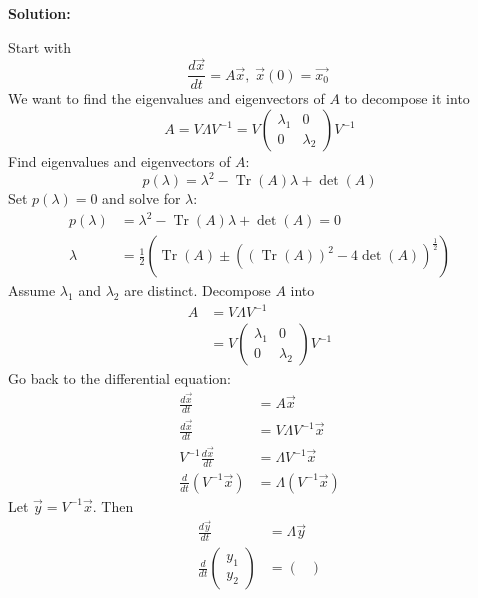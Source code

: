 \documentclass[12pt]{article}
\DeclareMathOperator{\Tr}{Tr}
\newenvironment{solution}{
    \textbf{Solution:}
    
}{
    
    \vspace{2em}
}
\begin{document}
\begin{solution}
    Start with
    \[
        \frac{d\vec{x}}{dt} = A\vec{x}, \; \vec{x}(0) = \vec{x_0} \;
    \]
    We want to find the eigenvalues and eigenvectors of \(A\) to decompose it into
    \[
        A = V\Lambda V^{-1} = V\begin{pmatrix}
            \lambda_1 & 0 \\
            0 & \lambda_2
        \end{pmatrix}V^{-1}
    \]
    Find eigenvalues and eigenvectors of \(A\):
    \[
        p(\lambda) = \lambda^2 - \Tr(A)\lambda + \det(A)
    \]
    Set \(p(\lambda) = 0\) and solve for \(\lambda\):
    \[
        \begin{aligned}
            p(\lambda) &= \lambda^2 - \Tr(A)\lambda + \det(A) = 0\\
            \lambda &= \frac{1}{2}\left(\Tr(A) \pm \left((\Tr(A))^2 - 4\det(A)\right)^{\frac{1}{2}}\right)
        \end{aligned}
    \]
    Assume \(\lambda_1\) and \(\lambda_2\) are distinct. Decompose \(A\) into
    \[
        \begin{aligned}
            A &= V\Lambda V^{-1} \\
            &= V\begin{pmatrix}
                \lambda_1 & 0 \\
                0 & \lambda_2
            \end{pmatrix}V^{-1}
        \end{aligned}
    \]
    Go back to the differential equation:
    \[
        \begin{aligned}
            \frac{d\vec{x}}{dt} &= A\vec{x} \\
            \frac{d\vec{x}}{dt} &= V\Lambda V^{-1}\vec{x} \\
            V^{-1}\frac{d\vec{x}}{dt} &= \Lambda V^{-1}\vec{x} \\
            \frac{d}{dt}(V^{-1}\vec{x}) &= \Lambda (V^{-1}\vec{x})
        \end{aligned}
    \]
    Let \(\vec{y} = V^{-1}\vec{x}\). Then
    \[
        \begin{aligned}
            \frac{d\vec{y}}{dt} &= \Lambda \vec{y} \\
            \frac{d}{dt} \begin{pmatrix}
                y_1 \\
                y_2
            \end{pmatrix} &= \begin{pmatrix}

\end{pmatrix}
\end{aligned}\]
\end{solution}
\end{document}

